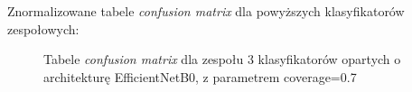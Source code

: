 \documentclass[polish,12pt]{aghthesis}
\begin{document}
\newpage
\noindent Znormalizowane tabele \textit{confusion matrix} dla powyższych klasyfikatorów zespołowych:
\begin{figure}[h!]%
    \begin{adjustbox}{minipage=1.0\paperwidth, pagecenter}
    \centering
    \qquad
    \end{adjustbox}
    \label{fig:eff-ens-3-0.7-matrices}
    \caption{Tabele \textit{confusion matrix} dla zespołu 3 klasyfikatorów opartych o architekturę EfficientNetB0, z parametrem coverage=0.7}
\end{figure}
\end{document}
